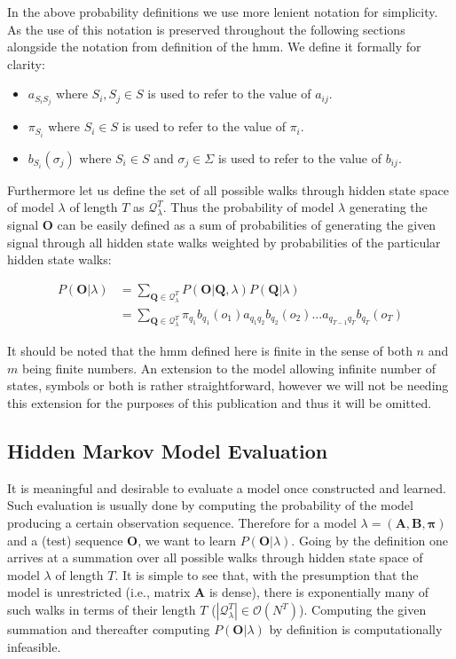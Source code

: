 In the above probability definitions we use more lenient notation for simplicity. As the use of this notation is preserved throughout the following sections alongside the notation from definition of the \gls{hmm}. We define it formally for clarity:
\begin{itemize}
	\item[] $a_{S_iS_j}$ where $S_i, S_j\in S$ is used to refer to the value of $a_{ij}$.
	\item[] $\pi_{S_i}$ where $S_i\in S$ is used to refer to the value of $\pi_i$.
	\item[] $b_{S_i}(\sigma_j)$ where $S_i\in S$ and $\sigma_j\in \Sigma$ is used to refer to the value of $b_{ij}$.
\end{itemize}

Furthermore let us define the set of all possible walks through hidden state space of model $\lambda$ of length $T$ as $\mathcal{Q}_\lambda^T$. Thus the probability of model $\lambda$ generating the signal $\mathbf{O}$ can be easily defined as a sum of probabilities of generating the given signal through all hidden state walks weighted by probabilities of the particular hidden state walks: 

\begin{align*}
P(\mathbf{O}|\lambda)&=\sum_{\mathbf{Q}\in\mathcal{Q}^T_\lambda}{P(\mathbf{O}|\mathbf{Q},\lambda)P(\mathbf{Q}|\lambda)}\\
&=\sum_{\mathbf{Q}\in\mathcal{Q}^T_\lambda}{\pi_{q_1}b_{q_1}(o_1)a_{q_1q_2}b_{q_2}(o_2)...a_{q_{T-1}q_T}b_{q_T}(o_T)}
\end{align*}

It should be noted that the \gls{hmm} defined here is finite in the sense of both $n$ and $m$ being finite numbers. An extension to the model allowing infinite number of states, symbols or both is rather straightforward, however we will not be needing this extension for the purposes of this publication and thus it will be omitted.

\subsection{Hidden Markov Model Evaluation}
It is meaningful and desirable to evaluate a model once constructed and learned. Such evaluation is usually done by computing the probability of the model producing a certain observation sequence. Therefore for a model $\lambda = (\mathbf{A}, \mathbf{B}, \boldsymbol{\pi})$ and a (test) sequence $\mathbf{O}$, we want to learn $P(\mathbf{O}|\lambda)$. Going by the definition one arrives at a summation over all possible walks through hidden state space of model $\lambda$ of length $T$. It is simple to see that, with the presumption that the model is unrestricted (i.e., matrix $\mathbf{A}$ is dense), there is exponentially many of such walks in terms of their length $T$ ($|\mathcal{Q}_\lambda^T|\in\mathcal{O}(N^T)$). Computing the given summation and thereafter computing $P(\mathbf{O}|\lambda)$ by definition is computationally infeasible.

